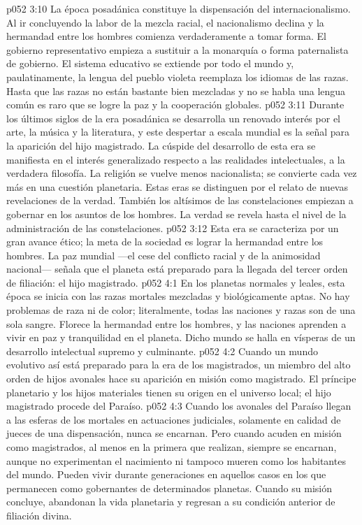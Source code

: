 \vs p052 3:10 \pc La época posadánica constituye la dispensación del internacionalismo. Al ir concluyendo la labor de la mezcla racial, el nacionalismo declina y la hermandad entre los hombres comienza verdaderamente a tomar forma. El gobierno representativo empieza a sustituir a la monarquía o forma paternalista de gobierno. El sistema educativo se extiende por todo el mundo y, paulatinamente, la lengua del pueblo violeta reemplaza los idiomas de las razas. Hasta que las razas no están bastante bien mezcladas y no se habla una lengua común es raro que se logre la paz y la cooperación globales.
\vs p052 3:11 Durante los últimos siglos de la era posadánica se desarrolla un renovado interés por el arte, la música y la literatura, y este despertar a escala mundial es la señal para la aparición del hijo magistrado. La cúspide del desarrollo de esta era se manifiesta en el interés generalizado respecto a las realidades intelectuales, a la verdadera filosofía. La religión se vuelve menos nacionalista; se convierte cada vez más en una cuestión planetaria. Estas eras se distinguen por el relato de nuevas revelaciones de la verdad. También los altísimos de las constelaciones empiezan a gobernar en los asuntos de los hombres. La verdad se revela hasta el nivel de la administración de las constelaciones.
\vs p052 3:12 Esta era se caracteriza por un gran avance ético; la meta de la sociedad es lograr la hermandad entre los hombres. La paz mundial ---el cese del conflicto racial y de la animosidad nacional--- señala que el planeta está preparado para la llegada del tercer orden de filiación: el hijo magistrado.
\vs p052 4:1 En los planetas normales y leales, esta época se inicia con las razas mortales mezcladas y biológicamente aptas. No hay problemas de raza ni de color; literalmente, todas las naciones y razas son de una sola sangre. Florece la hermandad entre los hombres, y las naciones aprenden a vivir en paz y tranquilidad en el planeta. Dicho mundo se halla en vísperas de un desarrollo intelectual supremo y culminante.
\vs p052 4:2 \pc Cuando un mundo evolutivo así está preparado para la era de los magistrados, un miembro del alto orden de hijos avonales hace su aparición en misión como magistrado. El príncipe planetario y los hijos materiales tienen su origen en el universo local; el hijo magistrado procede del Paraíso.
\vs p052 4:3 Cuando los avonales del Paraíso llegan a las esferas de los mortales en actuaciones judiciales, solamente en calidad de jueces de una dispensación, nunca se encarnan. Pero cuando acuden en misión como magistrados, al menos en la primera que realizan, siempre se encarnan, aunque no experimentan el nacimiento ni tampoco mueren como los habitantes del mundo. Pueden vivir durante generaciones en aquellos casos en los que permanecen como gobernantes de determinados planetas. Cuando su misión concluye, abandonan la vida planetaria y regresan a su condición anterior de filiación divina.
